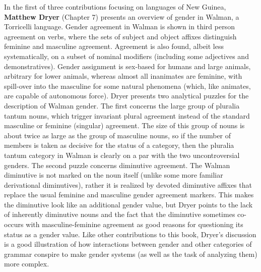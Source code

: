 \documentclass[output=collectionpaper]{langsci/langscibook}
\begin{document}
In the first of three contributions focusing on languages of New Guinea, \textbf{Matthew Dryer} (Chapter 7) presents an overview of gender in Walman, a Torricelli language. Gender agreement in Walman is shown in third person agreement on verbs, where the sets of subject and object affixes distinguish feminine and masculine agreement. Agreement is also found, albeit less systematically, on a subset of nominal modifiers (including some adjectives and demonstratives). Gender assignment is sex-based for humans and large animals, arbitrary for lower animals, whereas almost all inanimates are feminine, with spill-over into the masculine for some natural phenomena (which, like animates, are capable of autonomous force). Dryer presents two analytical puzzles for the description of Walman gender. The first concerns the large group of pluralia tantum nouns, which trigger invariant plural agreement instead of the standard masculine or feminine (singular) agreement. The size of this group of nouns is about twice as large as the group of masculine nouns, so if the number of members is taken as decisive for the status of a category, then the pluralia tantum category in Walman is clearly on a par with the two uncontroversial genders. The second puzzle concerns diminutive agreement. The Walman diminutive is not marked on the noun itself (unlike some more familiar derivational diminutives), rather it is realized by devoted diminutive affixes that replace the usual feminine and masculine gender agreement markers. This makes the diminutive look like an additional gender value, but Dryer points to the lack of inherently diminutive nouns and the fact that the diminutive sometimes co-occurs with masculine-feminine agreement as good reasons for questioning its status as a gender value. Like other contributions to this book, Dryer’s discussion is a good illustration of how interactions between gender and other categories of grammar conspire to make gender systems (as well as the task of analyzing them) more complex.
\end{document}
